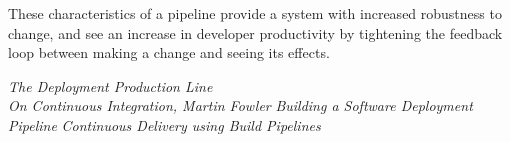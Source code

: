 \documentclass[11pt]{article}
\begin{document}
These characteristics of a pipeline provide a system with increased robustness
to change, and see an increase in developer productivity by tightening the
feedback loop between making a change and seeing its effects\cite{whitepaper}.


\begin{thebibliography}{99}

 \emph{The Deployment Production Line} \\
 \emph{On Continuous Integration, Martin Fowler}
\emph{Building a Software Deployment Pipeline}
 \emph{Continuous Delivery using Build Pipelines}
\end{thebibliography}
\end{document}
